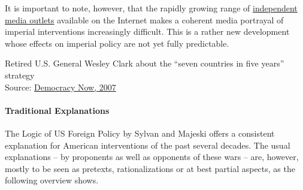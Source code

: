 It is important to note, however, that the rapidly growing range of
\href{https://swprs.org/media-navigator/}{independent media outlets}
available on the Internet makes a coherent media portrayal of imperial
interventions increasingly difficult. This is a rather new development
whose effects on imperial policy are not yet fully predictable.

Retired U.S. General Wesley Clark about the ``seven countries in five
years'' strategy\\
Source:
\href{https://www.democracynow.org/2007/3/2/gen_wesley_clark_weighs_presidential_bid}{Democracy
Now, 2007}

\hypertarget{traditional-explanations}{%
\paragraph{Traditional Explanations}\label{traditional-explanations}}

The Logic of US Foreign Policy by Sylvan and Majeski offers a consistent
explanation for American interventions of the past several decades. The
usual explanations -- by proponents as well as opponents of these wars
-- are, however, mostly to be seen as pretexts, rationalizations or at
best partial aspects, as the following overview shows.

